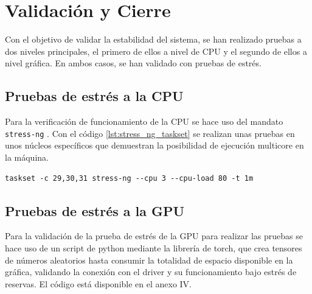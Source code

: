 





\section{Validación y Cierre}

Con el objetivo de validar la estabilidad del sistema, se han realizado pruebas a dos niveles principales, el primero de ellos a nivel de CPU y el segundo de ellos a nivel gráfica. En ambos casos, se han validado con pruebas de estrés.

\subsection{Pruebas de estrés a la CPU}

Para la verificación de funcionamiento de la CPU se hace uso del mandato \texttt{stress-ng} \cite{stress_ng_manpage}. Con el código \ref{lst:stress_ng_taskset} se realizan unas pruebas en unos núcleos específicos que demuestran la posibilidad de ejecución multicore en la máquina. 

\begin{lstlisting}[language=bash-custom, caption={Ejecución de stress-ng con afinidad de CPU}, label={lst:stress_ng_taskset}]
taskset -c 29,30,31 stress-ng --cpu 3 --cpu-load 80 -t 1m
\end{lstlisting}


\subsection{Pruebas de estrés a la GPU}

Para la validación de la prueba de estrés de la GPU para realizar las pruebas se hace uso de un script de python mediante la librería de torch, que crea tensores de números aleatorios hasta consumir la totalidad de espacio disponible en la gráfica, validando la conexión con el driver y su funcionamiento bajo estrés de reservas. El código está disponible en el anexo IV.

